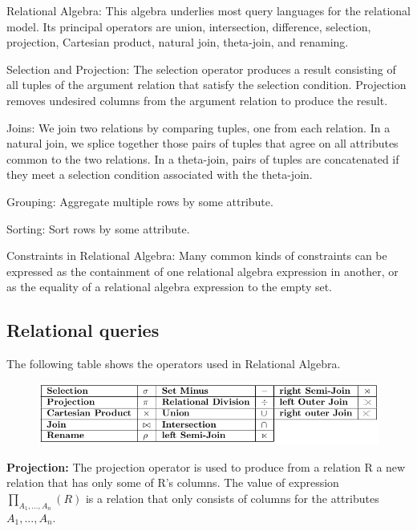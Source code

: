 \documentclass[11pt,oneside,a4paper]{article}
\begin{document}
\begin{compactitem}
	\item Relational Algebra: This algebra underlies most query languages for the relational model. Its principal operators are union, intersection, difference, selection, projection, Cartesian product, natural join, theta-join, and renaming.
	\item Selection and Projection: The selection operator produces a result consisting of all tuples of the argument relation that satisfy the selection condition. Projection removes undesired columns from the argument relation to produce the result.
	\item Joins: We join two relations by comparing tuples, one from each relation.	In a natural join, we splice together those pairs of tuples that agree on all attributes common to the two relations. In a theta-join, pairs of tuples are concatenated if they meet a selection condition associated with the theta-join.
	\item Grouping: Aggregate multiple rows by some attribute.
	\item Sorting: Sort rows by some attribute.
	\item Constraints in Relational Algebra: Many common kinds of constraints can be expressed as the containment of one relational algebra expression in another, or as the equality of a relational algebra expression to the empty set.
\end{compactitem}

\subsection{Relational queries}

The following table shows the operators used in Relational Algebra.

\vspace{-\topsep}
\begin{figure}[hb]
	\centering
	\includegraphics[width=0.7\linewidth]{figures/relational_algebra_operators}
	\label{fig:relationalalgebraoperators}
\end{figure}
\vspace{-\topsep}

\textbf{Projection:} The projection operator is used to produce from a relation R a new relation that has only some of R’s columns. The value of expression $\prod_{A_1,...,A_n}(R)$ is a relation that only
consists of columns for the attributes $A_1,...,A_n$.
\end{document}
